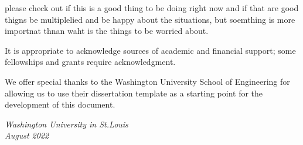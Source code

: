 \thesisacknowledgments

please check out if this is a good thing to be doing right now and if that are good thigns be multiplelied and be happy about the situations, but soemthing is more importnat thnan waht is the things to be worried about. 

\noindent It is appropriate to acknowledge sources of academic and financial support; some fellowships and grants require acknowledgment.

\noindent We offer special thanks to the Washington University School of Engineering for allowing us to use their dissertation template as a starting point for the development of this document.

\null\hfill \thesisauthor

\noindent
\textit{Washington University in St.\@ Louis}\\
\textit{August 2022}
